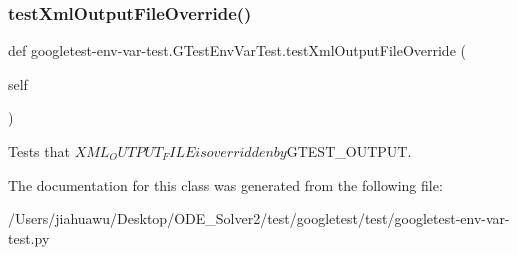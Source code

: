 \subsubsection{\texorpdfstring{test\+Xml\+Output\+File\+Override()}{testXmlOutputFileOverride()}}
{\footnotesize\ttfamily def googletest-\/env-\/var-\/test.\+G\+Test\+Env\+Var\+Test.\+test\+Xml\+Output\+File\+Override (\begin{DoxyParamCaption}\item[{}]{self }\end{DoxyParamCaption})}

\begin{DoxyVerb}Tests that $XML_OUTPUT_FILE is overridden by $GTEST_OUTPUT.\end{DoxyVerb}
 

The documentation for this class was generated from the following file\+:\begin{DoxyCompactItemize}
\item 
/\+Users/jiahuawu/\+Desktop/\+O\+D\+E\+\_\+\+Solver2/test/googletest/test/googletest-\/env-\/var-\/test.\+py\end{DoxyCompactItemize}

